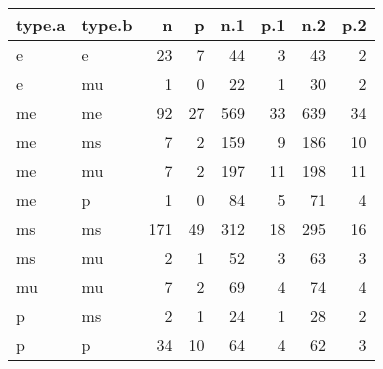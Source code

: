 \captionsetup[table]{labelformat=empty,skip=1pt}
\begin{longtable}{llrrrrrr}
\toprule
type.a & type.b & n & p & n.1 & p.1 & n.2 & p.2 \\ 
\midrule
e & e & 23 & 7 & 44 & 3 & 43 & 2 \\ 
e & mu & 1 & 0 & 22 & 1 & 30 & 2 \\ 
me & me & 92 & 27 & 569 & 33 & 639 & 34 \\ 
me & ms & 7 & 2 & 159 & 9 & 186 & 10 \\ 
me & mu & 7 & 2 & 197 & 11 & 198 & 11 \\ 
me & p & 1 & 0 & 84 & 5 & 71 & 4 \\ 
ms & ms & 171 & 49 & 312 & 18 & 295 & 16 \\ 
ms & mu & 2 & 1 & 52 & 3 & 63 & 3 \\ 
mu & mu & 7 & 2 & 69 & 4 & 74 & 4 \\ 
p & ms & 2 & 1 & 24 & 1 & 28 & 2 \\ 
p & p & 34 & 10 & 64 & 4 & 62 & 3 \\ 
 \bottomrule
\end{longtable}

